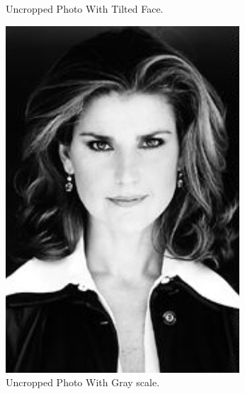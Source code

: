 \documentclass[12pt]{article} %
\begin{document}
\begin{figure}[H]
\begin{minipage}[b]{0.3\textwidth}
    \caption{Uncropped Photo With Tilted Face.}
  \end{minipage}
  \begin{minipage}[b]{0.3\textwidth}
    \includegraphics[width=\textwidth]{part1_1c}
    \caption{Uncropped Photo With Gray scale.}
  \end{minipage}
  \begin{minipage}[b]{0.3\textwidth}

\end{minipage}
\end{figure}
\end{document}
